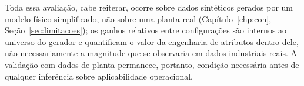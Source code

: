 Toda essa avaliação, cabe reiterar, ocorre sobre dados sintéticos gerados por um modelo físico simplificado, não sobre uma planta real (Capítulo~\ref{chp:con}, Seção~\ref{sec:limitacoes}); os ganhos relativos entre configurações são internos ao universo do gerador e quantificam o valor da engenharia de atributos dentro dele, não necessariamente a magnitude que se observaria em dados industriais reais. A validação com dados de planta permanece, portanto, condição necessária antes de qualquer inferência sobre aplicabilidade operacional.
